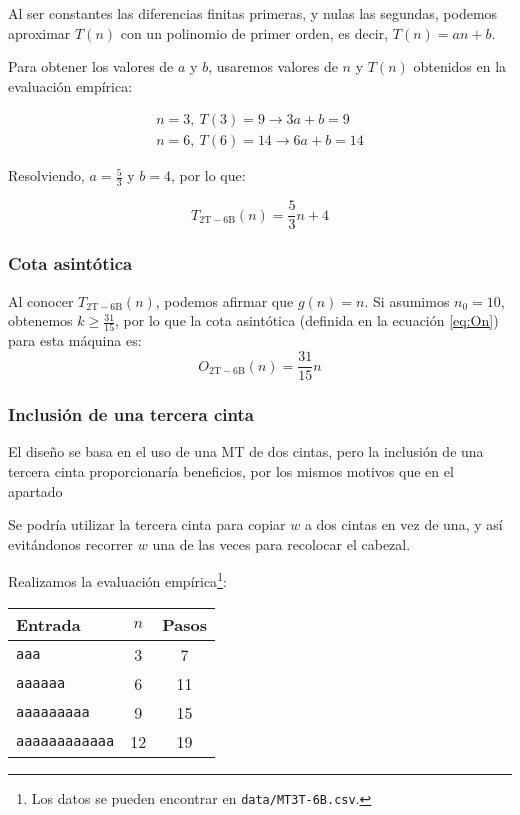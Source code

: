 Al ser constantes las diferencias finitas primeras, y nulas las segundas, podemos aproximar $T(n)$ con un polinomio de primer orden, es decir, $T(n) = an + b$.\medskip

Para obtener los valores de $a$ y $b$, usaremos valores de $n$ y $T(n)$ obtenidos en la evaluación empírica:

\begin{subequations}
    \begin{gather}
        n = 3,\ T(3) = 9 \rightarrow 3a + b = 9 \\
        n = 6,\ T(6) = 14 \rightarrow 6a + b = 14
    \end{gather}
\end{subequations}

Resolviendo, $a=\frac{5}{3}$ y $b=4$, por lo que:

\begin{equation}
    T_{\mathrm{2T-6B}}(n) = \frac{5}{3}n + 4
\end{equation}


\subsubsection*{Cota asintótica}
Al conocer $T_{\mathrm{2T-6B}}(n)$, podemos afirmar que $g(n) = n$. Si asumimos $n_0 = 10$, obtenemos $k \geq \frac{31}{15}$, por lo que la cota asintótica (definida en la ecuación \ref{eq:On}) para esta máquina es:
\begin{equation}
    O_{\mathrm{2T-6B}}(n) = \frac{31}{15} n
\end{equation}



\subsubsection*{Inclusión de una tercera cinta}
El diseño se basa en el uso de una MT de dos cintas, pero la inclusión de una tercera cinta proporcionaría beneficios, por los mismos motivos que en el apartado 

Se podría utilizar la tercera cinta para copiar $w$ a dos cintas en vez de una, y así evitándonos recorrer $w$ una de las veces para recolocar el cabezal.


Realizamos la evaluación empírica\footnote{Los datos se pueden encontrar en \texttt{data/MT3T-6B.csv}.}:

\begin{table}[h]
    \centering
    \begin{tabular}{lcc}
        Entrada & $n$ & Pasos \\
        \hline
        \texttt{aaa}                &  3  &  7 \\
        \texttt{aaaaaa}             &  6  & 11 \\
        \texttt{aaaaaaaaa}          &  9  & 15 \\
        \texttt{aaaaaaaaaaaa}       & 12  & 19 \\
    \end{tabular}
\end{table}

